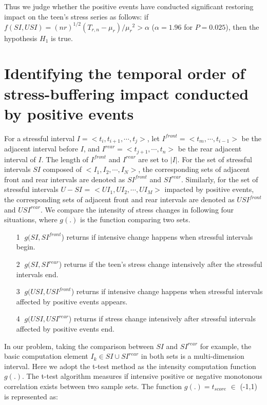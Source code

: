 Thus we judge whether the positive events have conducted significant restoring impact on the teen's stress series as follows:
if $f(SI,USI)=(nr)^{1/2}(T_{r,n}-\mu_{r})/{\mu_r}^2>\alpha$ ($\alpha = 1.96$ for $P=0.025$),
then the hypothesis $H_1$ is true.

\section{Identifying the temporal order of stress-buffering impact conducted by positive events}
\label{mod:mod2}
For a stressful interval $I = <t_i,t_{i+1},\cdots,t_j>$,
let $I^{front} = <t_m,\cdots,t_{i-1}>$ be the adjacent interval before $I$,
and $I^{rear} = <t_{j+1},\cdots,t_n>$ be the rear adjacent interval of $I$.
The length of $I^{front}$ and $I^{rear}$ are set to $|I|$.
For the set of stressful intervals $SI$ composed of $<I_1,I_2,\cdots,I_N>$,
the corresponding sets of adjacent front and rear intervals are denoted as $SI^{front}$ and $SI^{rear}$.
Similarly, for the set of stressful intervals $U-SI$ = $<UI_1,UI_2,\cdots, UI_M>$ impacted by positive events,
the corresponding sets of adjacent front and rear intervals are denoted as $USI^{front}$ and $USI^{rear}$.
We compare the intensity of stress changes in following four situations,
where $g(.)$ is the function comparing two sets.

\begin{itemize}
\item[\textcircled{1}] $g(SI,SI^{front}$) returns if intensive change happens when stressful intervals begin.
\item[\textcircled{2}] $g(SI,SI^{rear}$) returns if the teen's stress change intensively after the stressful intervals end.
\item[\textcircled{3}] $g(USI,USI^{front}$) returns if intensive change happens when stressful intervals affected by positive events appears.
\item[\textcircled{4}] $g(USI,USI^{rear}$) returns if stress change intensively after stressful intervals affected by positive events end.
\end{itemize}

In our problem, taking the comparison between $SI$ and $SI^{rear}$ for example,
the basic computation element $I_k \in SI \cup SI^{rear}$ in both sets is a multi-dimension interval.
Here we adopt the t-test method as the intensity computation function $g(.)$.
The t-test algorithm measures if intensive positive or negative monotonous correlation
exists between two sample sets.
The function $g(.) = t_{score}$ $\in$ (-1,1) is represented as:

